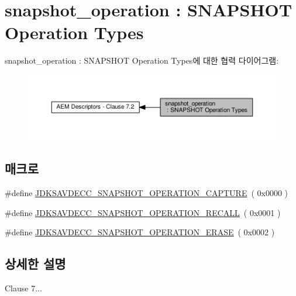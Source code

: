\hypertarget{group__snapshot__operation}{}\section{snapshot\+\_\+operation \+: S\+N\+A\+P\+S\+H\+OT Operation Types}
\label{group__snapshot__operation}
snapshot\+\_\+operation \+: S\+N\+A\+P\+S\+H\+OT Operation Types에 대한 협력 다이어그램\+:
\nopagebreak
\begin{figure}[H]
\begin{center}
\leavevmode
\includegraphics[width=350pt]{group__snapshot__operation}
\end{center}
\end{figure}
\subsection*{매크로}
\begin{DoxyCompactItemize}
\item 
\#define \hyperlink{group__snapshot__operation_gabbbcb498a33f1d9dd37d8a4251f49b3d}{J\+D\+K\+S\+A\+V\+D\+E\+C\+C\+\_\+\+S\+N\+A\+P\+S\+H\+O\+T\+\_\+\+O\+P\+E\+R\+A\+T\+I\+O\+N\+\_\+\+C\+A\+P\+T\+U\+RE}~( 0x0000 )
\item 
\#define \hyperlink{group__snapshot__operation_gaaba9549136897471483cc2e1b1bfb4e7}{J\+D\+K\+S\+A\+V\+D\+E\+C\+C\+\_\+\+S\+N\+A\+P\+S\+H\+O\+T\+\_\+\+O\+P\+E\+R\+A\+T\+I\+O\+N\+\_\+\+R\+E\+C\+A\+LL}~( 0x0001 )
\item 
\#define \hyperlink{group__snapshot__operation_ga7b66c4a283698ab2acdb6f916bc3bed9}{J\+D\+K\+S\+A\+V\+D\+E\+C\+C\+\_\+\+S\+N\+A\+P\+S\+H\+O\+T\+\_\+\+O\+P\+E\+R\+A\+T\+I\+O\+N\+\_\+\+E\+R\+A\+SE}~( 0x0002 )
\end{DoxyCompactItemize}


\subsection{상세한 설명}

\begin{DoxyItemize}
\item Clause 7... 
\end{DoxyItemize}

